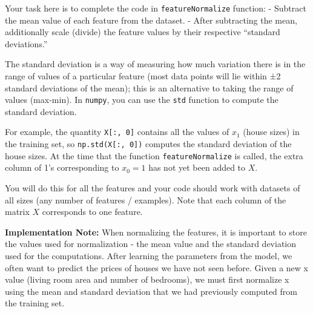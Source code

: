 \documentclass[11pt]{article}
\begin{document}
    Your task here is to complete the code in \texttt{featureNormalize}
function: - Subtract the mean value of each feature from the dataset. -
After subtracting the mean, additionally scale (divide) the feature
values by their respective ``standard deviations.''

The standard deviation is a way of measuring how much variation there is
in the range of values of a particular feature (most data points will
lie within ±2 standard deviations of the mean); this is an alternative
to taking the range of values (max-min). In \texttt{numpy}, you can use
the \texttt{std} function to compute the standard deviation.

For example, the quantity \texttt{X{[}:,\ 0{]}} contains all the values
of \(x_1\) (house sizes) in the training set, so
\texttt{np.std(X{[}:,\ 0{]})} computes the standard deviation of the
house sizes. At the time that the function \texttt{featureNormalize} is
called, the extra column of 1's corresponding to \(x_0 = 1\) has not yet
been added to \(X\).

You will do this for all the features and your code should work with
datasets of all sizes (any number of features / examples). Note that
each column of the matrix \(X\) corresponds to one feature.

\textbf{Implementation Note:} When normalizing the features, it is
important to store the values used for normalization - the mean value
and the standard deviation used for the computations. After learning the
parameters from the model, we often want to predict the prices of houses
we have not seen before. Given a new x value (living room area and
number of bedrooms), we must first normalize x using the mean and
standard deviation that we had previously computed from the training
set.
\end{document}
